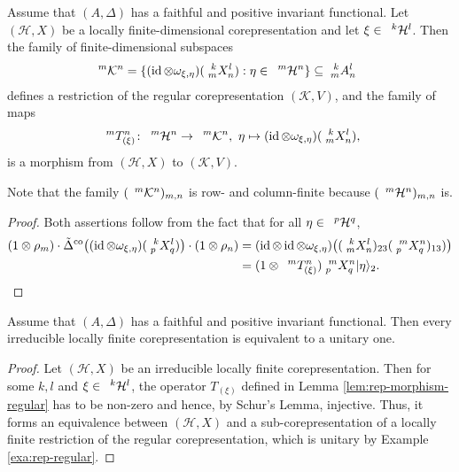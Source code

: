 \begin{Lem} \label{lem:rep-morphism-regular}
  Assume that $(A,\Delta)$ has a faithful and positive invariant
  functional.  Let $(\mathcal{H},X)$ be a locally
  finite-dimensional corepresentation and let $\xi \in
  \Gru{\mathcal{H}}{k}{l}$. Then the family of finite-dimensional
  subspaces
  \begin{align*}
   \Gru{\mathcal{K}}{m}{n}  &=  \{ (\id \otimes
   \omega_{\xi,\eta})(\Gr{X}{k}{l}{m}{n}) : \eta \in
   \Gru{\mathcal{H}}{m} {n}\} \subseteq \Gr{A}{k}{l}{m}{n}
  \end{align*}
  defines a restriction of the regular corepresentation
  $(\mathcal{K},V)$, and the family of maps
  \begin{align*}
    \Gru{T_{(\xi)}}{m}{n} \colon \Gru{\mathcal{H}}{m}{n} \to
    \Gru{\mathcal{K}}{m}{n}, \ \eta \mapsto (\id \otimes
    \omega_{\xi,\eta})(\Gr{X}{k}{l}{m}{n}),
  \end{align*}
  is a morphism from $(\mathcal{H},X)$ to $(\mathcal{K},V)$.
\end{Lem}
Note that the family $(\Gru{\mathcal{K}}{m}{n})_{m,n}$ is row- and
column-finite because $(\Gru{\mathcal{H}}{m}{n})_{m,n}$
is. 
\begin{proof} Both assertions  follow from the fact
  that for all $\eta \in \Gru{\mathcal{H}}{p}{q}$,
\begin{align*}
  (1 \otimes \rho_{m})\cdot \tilde \Delta^{\co}\big((\id \otimes
  \omega_{\xi,\eta})(\Gr{X}{k}{l}{p}{q})\big) \cdot (1 \otimes
  \rho_{n}) &= (\id \otimes \id \otimes \omega_{\xi,\eta})\big(
  (\Gr{X}{k}{l}{m}{n})_{23}(\Gr{X}{m}{n}{p}{q})_{13})\big) \\ &=(1
  \otimes \Gru{T_{(\xi)}}{m}{n})\Gr{X}{m}{n}{p}{q} |\eta\rangle_{2}.
\end{align*}
\end{proof}
\begin{Prop}  \label{prop:rep-unitarisable}
  Assume that $(A,\Delta)$ has a faithful and positive invariant
  functional. Then every irreducible locally finite corepresentation
  is equivalent to a unitary one.
\end{Prop}
\begin{proof}
  Let $(\mathcal{H},X)$ be an irreducible locally finite
  corepresentation. Then for some $k,l$ and $\xi \in
  \Gru{\mathcal{H}}{k}{l}$,  the operator  $T_{(\xi)}$  defined in
  Lemma \ref{lem:rep-morphism-regular} has to be non-zero and hence,
  by Schur's Lemma, injective. Thus, it forms an equivalence between
  $(\mathcal{H},X)$ and a sub-corepresentation of a locally finite
  restriction of the regular corepresentation, which is unitary by
  Example \ref{exa:rep-regular}.
\end{proof}


